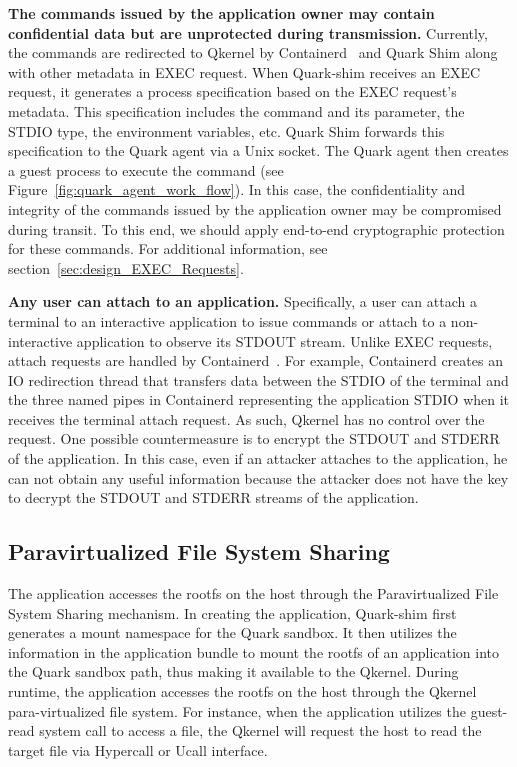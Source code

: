\textbf{The commands issued by the application owner may contain confidential data but are unprotected during transmission.} Currently, the commands are redirected to Qkernel by Containerd~\cite*{containerd} and Quark Shim along with other metadata in EXEC request. When Quark-shim receives an EXEC request, it generates 
a process specification based on the EXEC request’s metadata. This specification includes the command and its parameter, the STDIO type, the environment variables, etc. Quark Shim forwards this specification to the Quark agent via a Unix socket. The Quark agent then creates a guest process to 
execute the command (see Figure~\ref{fig:quark_agent_work_flow}). In this case, the confidentiality and integrity of the commands issued by the application owner may be compromised during transit. To this end, we should apply end-to-end cryptographic protection for these 
commands. For additional information, see section~\ref{sec:design_EXEC_Requests}.



\textbf{Any user can attach to an application.} Specifically, a user can attach a terminal to an interactive application to issue commands or attach to a non-interactive application to observe its STDOUT stream. Unlike EXEC requests, attach requests are handled by Containerd~\cite*{containerd}. For example, Containerd creates an IO redirection thread that 
transfers data between the STDIO of the terminal and the three named pipes in Containerd representing the application STDIO when it receives the terminal attach request. As such, Qkernel has no control over the request. One possible countermeasure is to encrypt the STDOUT and STDERR of the application. In this case, even if an attacker attaches to the application, he 
can not obtain any useful information because the attacker does not have the key to decrypt the STDOUT and STDERR streams of the application.

 

\subsection{Paravirtualized File System Sharing}
The application accesses the rootfs on the host through the Paravirtualized File System Sharing mechanism. In creating the application, Quark-shim first generates a mount namespace for the Quark sandbox. It then utilizes the information in the application bundle to mount the rootfs of an application 
into the Quark sandbox path, thus making it available to the Qkernel. During runtime, the application accesses the rootfs on the host through the Qkernel para-virtualized file system. For instance, when the application utilizes the guest-read system call to access a file, the Qkernel will request 
the host to read the target file via Hypercall or Ucall interface. 


